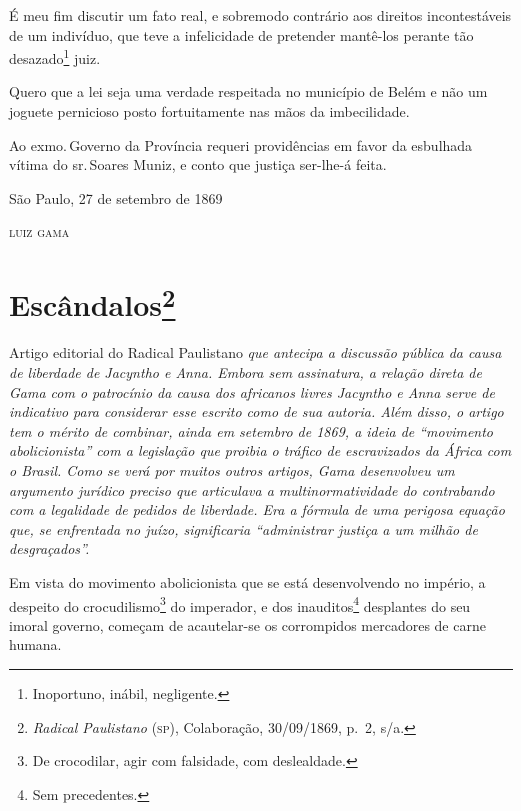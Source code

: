 É meu fim discutir um fato real, e sobremodo contrário aos direitos
incontestáveis de um indivíduo, que teve a infelicidade de pretender
mantê-los perante tão desazado\footnote{Inoportuno, inábil,
  negligente.} juiz.

Quero que a lei seja uma verdade respeitada no município de Belém e não
um joguete pernicioso posto fortuitamente nas mãos da imbecilidade.

Ao exmo.\,Governo da Província requeri providências em favor da esbulhada
vítima do sr.\,Soares Muniz, e conto que justiça ser-lhe-á feita.

\begin{flushright}
São Paulo, 27 de setembro de 1869

\textsc{luiz gama}
\end{flushright}

\chapter{Escândalos\footnote{\emph{Radical Paulistano} (\textsc{sp}),
  Colaboração, 30/09/1869, p.~2, s/a.}}

\begin{didascalia}
Artigo editorial do Radical Paulistano \emph{que antecipa a discussão
pública da causa de liberdade de Jacyntho e Anna. Embora sem assinatura,
a relação direta de Gama com o patrocínio da causa dos africanos livres
Jacyntho e Anna serve de indicativo para considerar esse escrito como de
sua autoria. Além disso, o artigo tem o mérito de combinar, ainda em
setembro de 1869, a ideia de ``movimento abolicionista'' com a legislação
que proibia o tráfico de escravizados da África com o Brasil. Como se
verá por muitos outros artigos, Gama desenvolveu um argumento jurídico
preciso que articulava a multinormatividade do contrabando com a
legalidade de pedidos de liberdade. Era a fórmula de uma perigosa
equação que, se enfrentada no juízo, significaria ``administrar justiça a
um milhão de desgraçados''.}
\end{didascalia}



Em vista do movimento abolicionista que se está desenvolvendo no
império, a despeito do crocudilismo\footnote{De crocodilar, agir com
  falsidade, com deslealdade.} do imperador, e dos inauditos\footnote{
  Sem precedentes.} desplantes do seu imoral governo, começam de
acautelar-se os corrompidos mercadores de carne humana.

